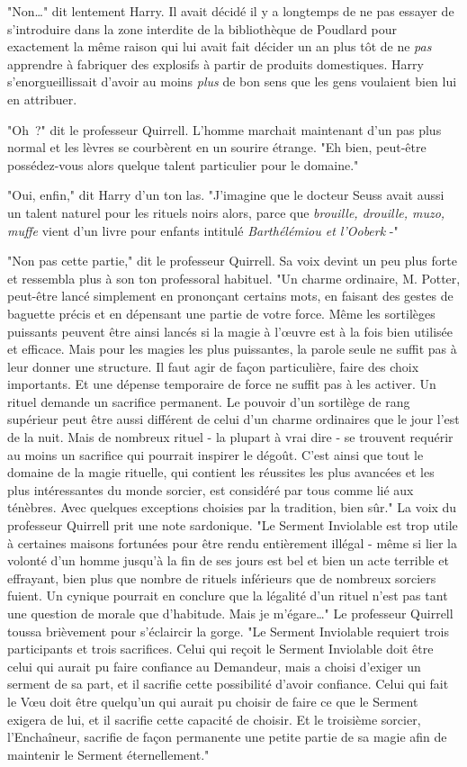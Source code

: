 "Non…" dit lentement Harry. Il avait décidé il y a longtemps de ne pas essayer de s'introduire dans la zone interdite de la bibliothèque de Poudlard pour exactement la même raison qui lui avait fait décider un an plus tôt de ne \emph{pas} apprendre à fabriquer des explosifs à partir de produits domestiques. Harry s'enorgueillissait d'avoir au moins \emph{plus} de bon sens que les gens voulaient bien lui en attribuer.

"Oh~?" dit le professeur Quirrell. L'homme marchait maintenant d'un pas plus normal et les lèvres se courbèrent en un sourire étrange. "Eh bien, peut-être possédez-vous alors quelque talent particulier pour le domaine."

"Oui, enfin," dit Harry d'un ton las. "J'imagine que le docteur Seuss avait aussi un talent naturel pour les rituels noirs alors, parce que \emph{brouille, drouille, muzo, muffe} vient d'un livre pour enfants intitulé \emph{Barthélémiou et l'Ooberk} -"

"Non pas cette partie," dit le professeur Quirrell. Sa voix devint un peu plus forte et ressembla plus à son ton professoral habituel. "Un charme ordinaire, M. Potter, peut-être lancé simplement en prononçant certains mots, en faisant des gestes de baguette précis et en dépensant une partie de votre force. Même les sortilèges puissants peuvent être ainsi lancés si la magie à l'œuvre est à la fois bien utilisée et efficace. Mais pour les magies les plus puissantes, la parole seule ne suffit pas à leur donner une structure. Il faut agir de façon particulière, faire des choix importants. Et une dépense temporaire de force ne suffit pas à les activer. Un rituel demande un sacrifice permanent. Le pouvoir d'un sortilège de rang supérieur peut être aussi différent de celui d'un charme ordinaires que le jour l'est de la nuit. Mais de nombreux rituel - la plupart à vrai dire - se trouvent requérir au moins un sacrifice qui pourrait inspirer le dégoût. C'est ainsi que tout le domaine de la magie rituelle, qui contient les réussites les plus avancées et les plus intéressantes du monde sorcier, est considéré par tous comme lié aux ténèbres. Avec quelques exceptions choisies par la tradition, bien sûr." La voix du professeur Quirrell prit une note sardonique. "Le Serment Inviolable est trop utile à certaines maisons fortunées pour être rendu entièrement illégal - même si lier la volonté d'un homme jusqu'à la fin de ses jours est bel et bien un acte terrible et effrayant, bien plus que nombre de rituels inférieurs que de nombreux sorciers fuient. Un cynique pourrait en conclure que la légalité d'un rituel n'est pas tant une question de morale que d'habitude. Mais je m'égare…" Le professeur Quirrell toussa brièvement pour s'éclaircir la gorge. "Le Serment Inviolable requiert trois participants et trois sacrifices. Celui qui reçoit le Serment Inviolable doit être celui qui aurait pu faire confiance au Demandeur, mais a choisi d'exiger un serment de sa part, et il sacrifie cette possibilité d'avoir confiance. Celui qui fait le Vœu doit être quelqu'un qui aurait pu choisir de faire ce que le Serment exigera de lui, et il sacrifie cette capacité de choisir. Et le troisième sorcier, l'Enchaîneur, sacrifie de façon permanente une petite partie de sa magie afin de maintenir le Serment éternellement."


